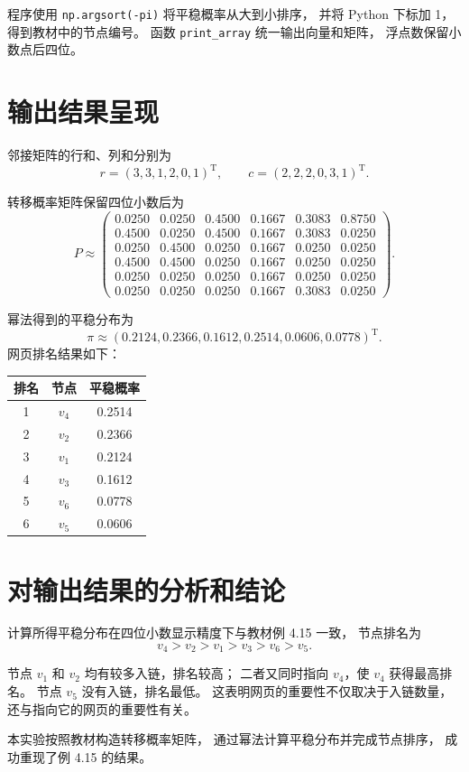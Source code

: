 \documentclass[UTF8,a4paper,11pt,fontset=fandol]{ctexart}
\begin{document}
程序使用 \texttt{np.argsort(-pi)}
将平稳概率从大到小排序，
并将 Python 下标加 1，得到教材中的节点编号。
函数 \texttt{print\_array} 统一输出向量和矩阵，
浮点数保留小数点后四位。

\section{输出结果呈现}

邻接矩阵的行和、列和分别为
\[
r=(3,3,1,2,0,1)^{\mathrm T},\qquad
c=(2,2,2,0,3,1)^{\mathrm T}.
\]

转移概率矩阵保留四位小数后为
\[
P\approx
\begin{pmatrix}
0.0250&0.0250&0.4500&0.1667&0.3083&0.8750\\
0.4500&0.0250&0.4500&0.1667&0.3083&0.0250\\
0.0250&0.4500&0.0250&0.1667&0.0250&0.0250\\
0.4500&0.4500&0.0250&0.1667&0.0250&0.0250\\
0.0250&0.0250&0.0250&0.1667&0.0250&0.0250\\
0.0250&0.0250&0.0250&0.1667&0.3083&0.0250
\end{pmatrix}.
\]

幂法得到的平稳分布为
\[
\pi\approx
(0.2124,0.2366,0.1612,0.2514,0.0606,0.0778)^{\mathrm T}.
\]
网页排名结果如下：
\begin{center}
\begin{tabular}{ccc}
\toprule
排名 & 节点 & 平稳概率\\
\midrule
1 & $v_4$ & 0.2514\\
2 & $v_2$ & 0.2366\\
3 & $v_1$ & 0.2124\\
4 & $v_3$ & 0.1612\\
5 & $v_6$ & 0.0778\\
6 & $v_5$ & 0.0606\\
\bottomrule
\end{tabular}
\end{center}

\section{对输出结果的分析和结论}

计算所得平稳分布在四位小数显示精度下与教材例 4.15 一致，
节点排名为
\[
v_4>v_2>v_1>v_3>v_6>v_5.
\]

节点 $v_1$ 和 $v_2$ 均有较多入链，排名较高；
二者又同时指向 $v_4$，使 $v_4$ 获得最高排名。
节点 $v_5$ 没有入链，排名最低。
这表明网页的重要性不仅取决于入链数量，
还与指向它的网页的重要性有关。

本实验按照教材构造转移概率矩阵，
通过幂法计算平稳分布并完成节点排序，
成功重现了例 4.15 的结果。
\end{document}
